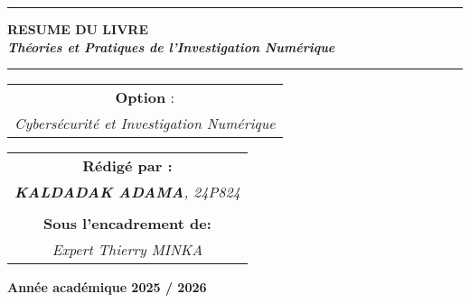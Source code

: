 \documentclass[memoire, 12pt]{report}
\begin{document}
\begin{titlepage}
\begin{center}
		\vspace{0.5cm}
		\begin{tabular}{l*{40}{@{\hskip 3.5cm}c@{\hskip5cm}} p{3.5cm} r}
		\end{tabular}
		
		\noindent\rule{\textwidth}{0.7mm}
		\Large{{\textbf{RESUME DU LIVRE}}}\\
		\Large{{\textbf{\textit{Théories et Pratiques de l’Investigation Numérique}}}}
		\noindent\rule{\textwidth}{0.7mm}
	\end{center}
		
	\begin{center}
	\begin{tabular}{c}
		
		\vspace{0.1cm}
		\normalsize
	
	
		\vspace{1cm}
		\normalsize\textbf{Option }:\\
		\normalsize				
		\textsl{Cybersécurité et Investigation Numérique}
		
	\end{tabular}
	\end{center}
		
	\begin{center}
		\normalsize %
		\begin{tabular}{c}
			\vspace{0.07cm}
			\hspace{0.02cm} \textbf{\textbf{Rédigé par :}}\\
			\hspace{0.02cm} \textsl{\textbf{KALDADAK ADAMA}, 24P824}\\\\
			\vspace{0.1cm}
			\hspace{0.02cm} \textbf{Sous l'encadrement de:}\\
			\hspace{0.02cm} \textsl{Expert Thierry MINKA}\\
				
               
		\end{tabular}
	\end{center}
    
	\vspace{4cm}
	\begin{center}
		\textbf{Année académique 2025 / 2026}
	\end{center}
		
	\vspace{-1.4cm}
	
		
	\vfill%
	
\end{titlepage}
\end{document}
